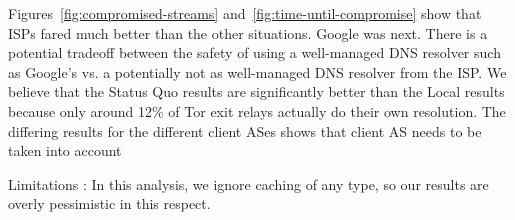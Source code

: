 Figures~\ref{fig:compromised-streams}
and~\ref{fig:time-until-compromise} show that
ISPs fared much better than the other situations. Google was next. There is a potential 
tradeoff between the safety of using a well-managed DNS resolver such as Google's vs. 
a potentially not as well-managed DNS resolver from the ISP.
We believe that the Status Quo results are significantly better than the 
Local results because only around 12\% 
of Tor exit relays actually do their own resolution.
The differing results for the different client ASes shows that client AS needs to be 
taken into account 

Limitations :
In this analysis, we ignore caching of any type, so our results are overly 
pessimistic in this respect. 
